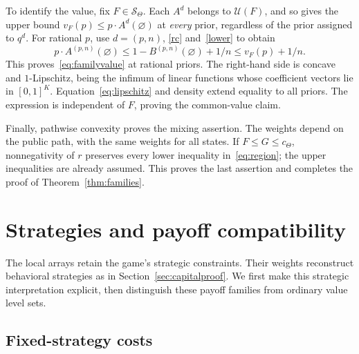 \documentclass[11pt,a4paper]{article}
\theoremstyle{definition}
\theoremstyle{remark}
\newcommand{\UU}{\mathcal U}
\begin{document}
To identify the value, fix $F\in\mathcal S_\Theta$. Each $A^d$
belongs to $\UU(F)$, and so gives the upper bound
$v_F(p)\leq p\cdot A^d(\varnothing)$ at \emph{every} prior, regardless
of the prior assigned to $q^d$. For rational $p$, use $d=(p,n)$,
\eqref{rc} and~\eqref{lower} to obtain
\[
 p\cdot A^{(p,n)}(\varnothing)
 \leq1-B^{(p,n)}(\varnothing)+1/n\leq v_F(p)+1/n.
\]
This proves~\eqref{eq:familyvalue} at rational priors. The right-hand
side is concave and $1$-Lipschitz, being the infimum of linear
functions whose coefficient vectors lie in $[0,1]^K$.
Equation~\eqref{eq:lipschitz} and density extend equality to all priors.
The expression is independent of $F$, proving the common-value claim.

Finally, pathwise convexity proves the mixing assertion. The weights
depend on the public path, with the same weights for all states.
If $F\leq G\leq c_\Theta$, nonnegativity of $r$ preserves every
lower inequality in~\eqref{eq:region}; the upper inequalities are
already assumed. This proves the last assertion and completes the
proof of Theorem~\ref{thm:families}.

\section{Strategies and payoff compatibility}\label{sec:examples}

The local arrays retain the game's strategic constraints. Their
weights reconstruct behavioral strategies as in Section~\ref{sec:capitalproof}.
We first make this strategic interpretation explicit, then distinguish
these payoff families from ordinary value level sets.

\subsection{Fixed-strategy costs}
\end{document}
